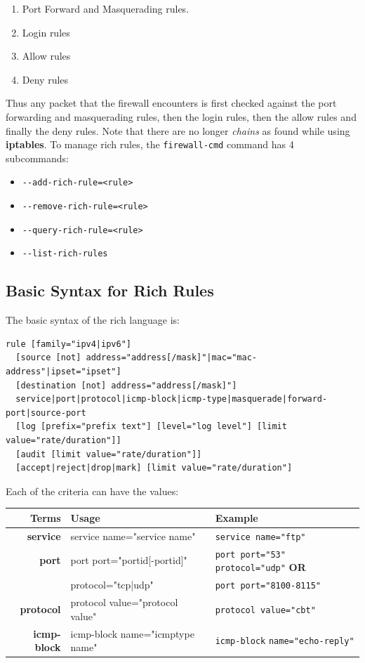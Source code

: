 \begin{enumerate}
	\item Port Forward and Masquerading rules.
	\item Login rules
	\item Allow rules
	\item Deny rules
\end{enumerate}

\noindent
Thus any packet that the firewall encounters is first checked against the port forwarding and masquerading rules, then the login rules, then the allow rules and finally the deny rules. Note that there are no longer \textit{chains} as found while using \textbf{iptables}. To manage rich rules, the \verb|firewall-cmd| command has 4 subcommands:

\begin{itemize}
	\item \verb|--add-rich-rule=<rule>|
	\item \verb|--remove-rich-rule=<rule>|
	\item \verb|--query-rich-rule=<rule>|
	\item \verb|--list-rich-rules|
\end{itemize}

\subsection{Basic Syntax for Rich Rules}
The basic syntax of the rich language is:

\vspace{-15pt}
\begin{verbatim}
rule [family="ipv4|ipv6"]
  [source [not] address="address[/mask]"|mac="mac-address"|ipset="ipset"]
  [destination [not] address="address[/mask]"]
  service|port|protocol|icmp-block|icmp-type|masquerade|forward-port|source-port
  [log [prefix="prefix text"] [level="log level"] [limit value="rate/duration"]]
  [audit [limit value="rate/duration"]]
  [accept|reject|drop|mark] [limit value="rate/duration"]
\end{verbatim}
\vspace{-10pt}	

\noindent
Each of the criteria can have the values:

\noindent
\begin{tabular}{rM{0.48}M{0.3}}
	\toprule
	\textbf{Terms} &\textbf{Usage} &\textbf{Example}\\
	\midrule
	\textbf{service}	&service name="service name" &\verb|service name="ftp"|\\
	\midrule
	\textbf{port}	&port port="portid[-portid]" &\verb|port port="53"| \verb|protocol="udp"| \textbf{OR}\\
	&protocol="tcp|udp" &\verb|port port="8100-8115"|\\
	\midrule
	\textbf{protocol}	&protocol value="protocol value" &\verb|protocol value="cbt"|\\
	\midrule
	\textbf{icmp-block}	&icmp-block name="icmptype name" &\verb|icmp-block| \verb|name="echo-reply"|\\
	\midrule
\end{tabular}

